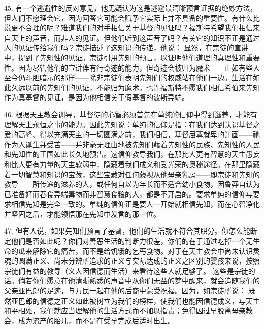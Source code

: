 45. 有一个逃避性的反对意见，他无疑认为这是逃避最清晰预言证据的绝妙方法，但人们不愿理会它，因为回答它可能会赋予它实际上并不具备的重要性。有什么比说更不合理的呢？难道我们的对手相信关于基督的见证吗？福斯特希望我们相信来自天上的声音，而非人的见证。但他们听到这声音了吗？有关它的知识不正是通过人的见证传给我们吗？宗徒描述了这知识的传递，他说： 显然，在宗徒的宣讲中，提到了先知性的见证。宗徒引用先知的预言，以证明他们道理的真理性和重要性。因为尽管他们的宣讲伴有行奇迹的能力，但奇迹会被归为魔术——正如有些人至今仍斗胆暗示的那样——除非宗徒们表明先知们的权威站在他们一边。生活在如此久远以前的先知们的见证，不能归为魔术。也许福斯特不愿我们相信希伯来先知作为真基督的见证，是因为他相信关于假基督的波斯异端。\par

46. 根据天主教会训导，基督徒的心智必须首先在单纯的信仰中得到滋养，才能有理解天上永恒之事的能力。因此先知说：单纯的信仰是指：在我们达到认识基督之爱的高峰、得以充满天主的一切圆满之前，我们相信，基督屈尊就卑的计画——祂作为人诞生并受苦——并非毫无理由地被先知们藉着先知性的民族、先知性的人民和先知性的王国如此长久地预告。这信仰教导我们，在那比人更有智慧的天主愚妄和比人更有力量的天主软弱中，隐藏着我们成义和受光荣的奥秘途径。在那里隐藏着一切智慧和知识的宝藏，这些宝藏对任何藐视从他母亲乳房——即宗徒和先知的教导——所传递的滋养的人，或任何自以为年长而不适合幼小食物，因鲁莽自认为已准备好而吞食异端毒物而非智慧食粮的人，都是不开启的。要求单纯的信仰与要求相信先知是完全一致的。单纯的信仰正是要人一开始就相信先知，而在心智净化并坚固之后，才能领悟那在先知中发言的那一位。\par

47. 但有人说，如果先知们预言了基督，他们的生活就不符合其职分。你怎么能断定他们是否如此呢？你们对善恶生活的判断力很差，你们的在于通过吃掉一个无生命的瓜来解除它的痛苦，而不是给饥饿的乞丐食物。对于在天主教会中尚未认识灵魂的圆满正义、尚未分辨所追求的正义与实际达成的正义之区别的婴孩来说，按照宗徒们有益的教导（义人因信德而生活）来看待这些人就足够了。  这些是宗徒的话。倘若你们愿意在他清晰熟悉的声音中从你们无益的梦中醒来，就会追随我们的父亲亚巴郎的足迹，与万民一起在他的后裔中蒙受祝福。因为，如宗徒所说：  既然亚巴郎的信德之正义如此被树立为我们的榜样，使我们也能因信德成义，与天主和平相处，我们就应当理解他的生活方式而不加以指责；免得因过早脱离母亲教会，成为流产的胎儿，而不是在受孕完成后适时出生。\par

